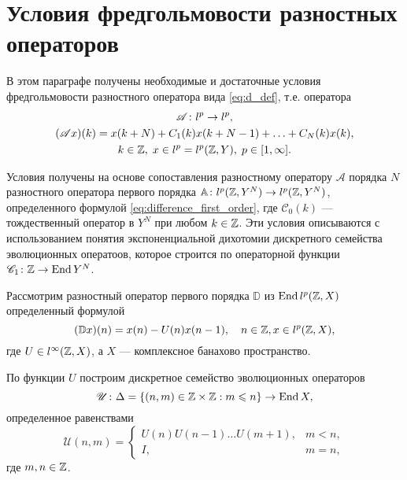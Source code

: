 \chapter{Условия фредгольмовости разностных операторов}\label{sec:fredhlom}
В этом параграфе получены необходимые и достаточные условия фредгольмовости разностного оператора вида \eqref{eq:d_def}, т.е. оператора
\begin{gather*}
    \mathcal A \colon l^p  \to l^p, \\
    (\mathcal A x)(k) = x(k + N) + C_1(k) x(k + N - 1) + \dotsc + C_N(k) x(k), \\
    k \in \mathbb{Z}, \; x \in l^p = l^p(\mathbb{Z}, Y), \; p \in [1, \infty].
\end{gather*}

Условия получены на основе сопоставления разностному оператору $\mathcal A$ порядка $N$ разностного оператора первого порядка $ \mathbb A\colon l^p(\mathbb{Z}, Y^N) \to l^p(\mathbb{Z}, Y^N)$, определенного формулой \eqref{eq:difference_first_order}, где $\mathcal C_0(k)$ --- тождественный оператор в $Y^N$ при любом $k \in \mathbb{Z}$. Эти условия описываются с использованием понятия экспоненциальной дихотомии дискретного семейства эволюционных оператоов, которое строится по операторной функции $\mathcal C_1\colon \mathbb{Z} \to \operatorname{End}{Y^N}$.

Рассмотрим разностный оператор первого порядка $\mathbb D$ из $\operatorname{End} l^p(\mathbb{Z}, X)$ определенный формулой
\[ (\mathbb D x)(n) = x(n) - U(n)x(n - 1), \quad n \in \mathbb{Z}, x \in l^p(\mathbb{Z}, X), \]
где $U \in l^\infty(\mathbb{Z}, X)$, а $X$ --- комплексное банахово пространство.

По функции $U$ построим дискретное семейство эволюционных операторов
\[\mathcal U \colon \Delta = \left\{(n, m) \in \mathbb{Z} \times \mathbb{Z} : m \leqslant n\right\} \to \operatorname{End} X, \]
определенное равенствами
\[
    \mathcal U (n, m) = \begin{cases}
        U(n)U(n-1)\dotsc U(m+1), & m < n, \\
        I,                       & m = n,
    \end{cases}
\]
где $m, n \in \mathbb{Z}$.

